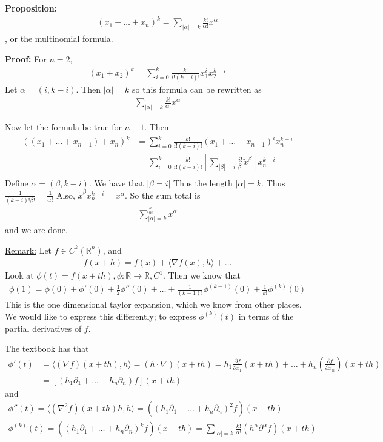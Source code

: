 \documentclass{article}
\newcommand*{\iprod}[1]{\langle #1 \rangle}
\newcommand*{\rr}{\mathbb{R}}%
\begin{document}
\textbf{Proposition:} \begin{align*}
    (x_1+\dots+x_n)^k=\sum_{|\alpha|=k}\frac{k!}{\alpha!}x^\alpha
\end{align*}, or the multinomial formula. 

\textbf{Proof:} For $n=2$, \begin{align*}
    (x_1+x_2)^k=\sum_{i=0}^{k}\frac{k!}{i!(k-i)!}x_1^ix_2^{k-i}
\end{align*} Let $\alpha=(i,k-i)$. Then $|\alpha|=k$ so this formula can be rewritten as \begin{align*}
    \sum_{|\alpha|=k}\frac{k!}{\alpha!}x^\alpha
\end{align*}

Now let the formula be true for $n-1$. Then \begin{align*}
    ((x_1+\dots+x_{n-1})+x_n)^k&=\sum_{i=0}^{k}\frac{k!}{i!(k-i)!}(x_1+\dots+x_{n-1})^ix_n^{k-i}\\
    &=\sum_{i=0}^{k}\frac{k!}{i!(k-i)!}[\sum_{|\beta|=i}\frac{i!}{\beta!}\tilde{x}^\beta]x_n^{k-i}\\
\end{align*} Define $\alpha=(\beta,k-i)$. We have that $|\beta=i|$ Thus the length $|\alpha|=k$. Thus $\frac{1}{(k-i)!\beta!}=\frac{1}{\alpha!}$ Also, $\tilde{x}^\beta x_n^{k-i}=x^\alpha$. So the sum total is \begin{align*}
    \sum_{|\alpha|=k}^{\frac{k!}{\alpha!}}x^\alpha
\end{align*} and we are done.

\underline{Remark:} Let $f\in C^k(\rr^n)$, and \begin{align*}
    f(x+h)=f(x)+\iprod{\nabla f(x),h}+\dots
\end{align*} Look at $\phi(t)=f(x+th), \phi:\rr\to\rr,C^1$. Then we know that \begin{align*}
    \phi(1)=\phi(0)+\phi'(0)+\frac{1}{2}\phi''(0)+\dots+\frac{1}{(k-1)!}\phi^{(k-1)}(0)+\frac{1}{k!}\phi^(k)(0)
\end{align*} This is the one dimensional taylor expansion, which we know from other places. We would like to express this differently; to express $\phi^{(k)}(t)$ in terms of the partial derivatives of $f$. 

The textbook has that \begin{align*}
    \phi'(t)&=\iprod{(\nabla f)(x+th),h}=(h\cdot\nabla)(x+th)=h_1\frac{\partial f}{\partial x_1}(x+th)+\dots+h_n(\frac{\partial f}{\partial x_n})(x+th)\\
    &=[(h_1\partial_1+\dots+h_n\partial_n)f](x+th)
\end{align*} and \begin{align*}
    \phi''(t)=\iprod{(\nabla^2 f)(x+th)h,h}=((h_1\partial_1+\dots+h_n\partial_n)^2 f)(x+th)\\
    \phi^(k)(t)=((h_1\partial_1+\dots+h_n\partial_n)^k f)(x+th)=\sum_{|\alpha|=k}\frac{k!}{\alpha!}(h^\alpha\partial^\alpha f)(x+th)
\end{align*}
\end{document}
